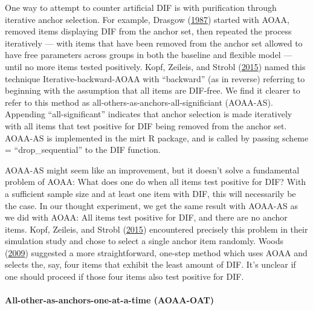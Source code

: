 \documentclass[
  11pt,
]{article}
\begin{document}
One way to attempt to counter artificial DIF is with purification through iterative anchor selection. For example, Drasgow (\protect\hyperlink{ref-drasgow1987study}{1987}) started with AOAA, removed items displaying DIF from the anchor set, then repeated the process iteratively --- with items that have been removed from the anchor set allowed to have free parameters across groups in both the baseline and flexible model --- until no more items tested positively. Kopf, Zeileis, and Strobl (\protect\hyperlink{ref-kopf2015framework}{2015}) named this technique Iterative-backward-AOAA with \enquote{backward} (as in reverse) referring to beginning with the assumption that all items are DIF-free. We find it clearer to refer to this method as all-others-as-anchors-all-significiant (AOAA-AS). Appending \enquote{all-significant} indicates that anchor selection is made iteratively with all items that test positive for DIF being removed from the anchor set. AOAA-AS is implemented in the mirt R package, and is called by passing scheme = \enquote{drop\_sequential} to the DIF function.

AOAA-AS might seem like an improvement, but it doesn't solve a fundamental problem of AOAA: What does one do when all items test positive for DIF? With a sufficient sample size and at least one item with DIF, this will necessarily be the case. In our thought experiment, we get the same result with AOAA-AS as we did with AOAA: All items test positive for DIF, and there are no anchor items. Kopf, Zeileis, and Strobl (\protect\hyperlink{ref-kopf2015framework}{2015}) encountered precisely this problem in their simulation study and chose to select a single anchor item randomly. Woods (\protect\hyperlink{ref-woods2009empirical}{2009}) suggested a more straightforward, one-step method which uses AOAA and selects the, say, four items that exhibit the least amount of DIF. It's unclear if one should proceed if those four items also test positive for DIF.

\hypertarget{all-other-as-anchors-one-at-a-time-aoaa-oat}{%
\paragraph{All-other-as-anchors-one-at-a-time (AOAA-OAT)}\label{all-other-as-anchors-one-at-a-time-aoaa-oat}}
\end{document}
